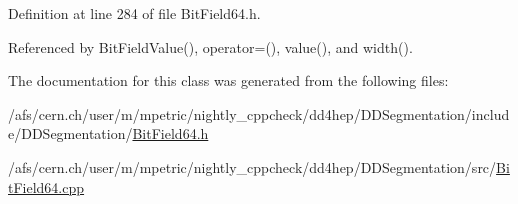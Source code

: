 Definition at line 284 of file BitField64.h.

Referenced by BitFieldValue(), operator=(), value(), and width().

The documentation for this class was generated from the following files:\begin{DoxyCompactItemize}
\item 
/afs/cern.ch/user/m/mpetric/nightly\_\-cppcheck/dd4hep/DDSegmentation/include/DDSegmentation/\hyperlink{_d_d_segmentation_2include_2_d_d_segmentation_2_bit_field64_8h}{BitField64.h}\item 
/afs/cern.ch/user/m/mpetric/nightly\_\-cppcheck/dd4hep/DDSegmentation/src/\hyperlink{_bit_field64_8cpp}{BitField64.cpp}\end{DoxyCompactItemize}
